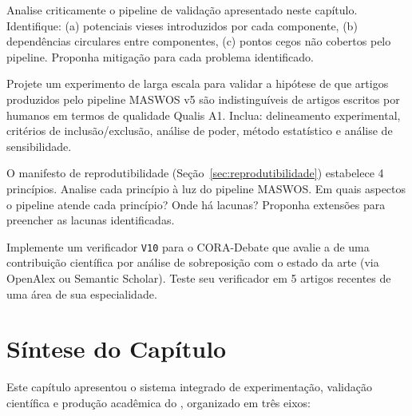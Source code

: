 \begin{exercicio}[PhD]
Analise criticamente o pipeline de validação apresentado neste
capítulo. Identifique: (a) potenciais vieses introduzidos por cada
componente, (b) dependências circulares entre componentes,
(c) pontos cegos não cobertos pelo pipeline. Proponha mitigação
para cada problema identificado.
\end{exercicio}

\begin{exercicio}[PhD]
Projete um experimento de larga escala para validar a hipótese de
que artigos produzidos pelo pipeline MASWOS v5 são indistinguíveis
de artigos escritos por humanos em termos de qualidade Qualis A1.
Inclua: delineamento experimental, critérios de inclusão/exclusão,
análise de poder, método estatístico e análise de sensibilidade.
\end{exercicio}

\begin{exercicio}[PhD]
O manifesto de reprodutibilidade (Seção~\ref{sec:reprodutibilidade})
estabelece 4 princípios. Analise cada princípio à luz do pipeline
MASWOS. Em quais aspectos o pipeline atende cada princípio? Onde
há lacunas? Proponha extensões para preencher as lacunas
identificadas.
\end{exercicio}

\begin{exercicio}[PhD]
Implemente um verificador \texttt{V10} para o CORA-Debate que avalie
a  de uma contribuição científica por análise de
sobreposição com o estado da arte (via OpenAlex ou Semantic Scholar).
Teste seu verificador em 5 artigos recentes de uma área de sua
especialidade.
\end{exercicio}

\section*{Síntese do Capítulo}

Este capítulo apresentou o sistema integrado de experimentação,
validação científica e produção acadêmica do \opencodeeco{},
organizado em três eixos:

